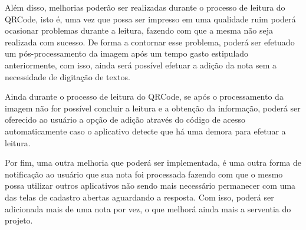 Além disso, melhorias poderão ser realizadas durante o processo de leitura do QRCode, isto é, uma vez que possa ser impresso em uma qualidade ruim poderá ocasionar problemas durante a leitura, fazendo com que a mesma não seja realizada com sucesso. De forma a contornar esse problema, poderá ser efetuado um pós-processamento da imagem após um tempo gasto estipulado anteriormente, com isso, ainda será possível efetuar a adição da nota sem a necessidade de digitação de textos.

Ainda durante o processo de leitura do QRCode, se após o processamento da imagem não for possível concluir a leitura e a obtenção da informação, poderá ser oferecido ao usuário a opção de adição através do código de acesso automaticamente caso o aplicativo detecte que há uma demora para efetuar a leitura.

Por fim, uma outra melhoria que poderá ser implementada, é uma outra forma de notificação ao usuário que sua nota foi processada fazendo com que o mesmo possa utilizar outros aplicativos não sendo mais necessário permanecer com uma das telas de cadastro abertas aguardando a resposta. Com isso, poderá ser adicionada mais de uma nota por vez, o que melhorá ainda mais a serventia do projeto.